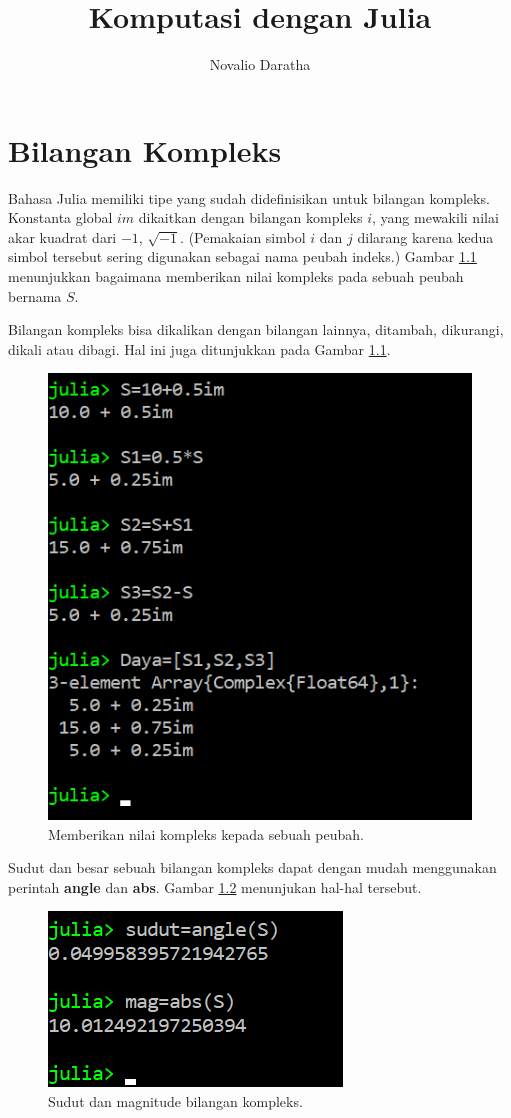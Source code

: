 \documentclass[12pt,a4paper]{memoir}
\author{Novalio Daratha}
\title{Komputasi dengan Julia}
\begin{document}
	\maketitle
	\chapter{Bilangan Kompleks}
	
	Bahasa Julia memiliki tipe yang sudah didefinisikan untuk bilangan kompleks. Konstanta global $im$ dikaitkan dengan bilangan kompleks $i$, yang mewakili nilai akar kuadrat  dari $-1$, $\sqrt{-1}$. (Pemakaian simbol $i$ dan $j$ dilarang karena kedua simbol tersebut sering digunakan sebagai nama peubah indeks.) Gambar \ref{fig:complexnumber1} menunjukkan bagaimana memberikan nilai kompleks pada sebuah peubah bernama $S$.
	
	Bilangan kompleks bisa dikalikan dengan bilangan lainnya, ditambah, dikurangi, dikali atau dibagi. Hal ini juga ditunjukkan pada Gambar \ref{fig:complexnumber1}.

\begin{figure}[h]
	\centering
	\includegraphics[width=0.7\linewidth]{images/complexnumber1}
	\caption{Memberikan nilai kompleks kepada sebuah peubah.}
	\label{fig:complexnumber1}
\end{figure}
	
	Sudut dan besar sebuah bilangan kompleks dapat dengan mudah menggunakan perintah \textbf{angle} dan \textbf{abs}. Gambar \ref{fig:complexnumber2} menunjukan hal-hal tersebut.
	
	\begin{figure}
		\centering
		\includegraphics[width=0.7\linewidth]{images/complexnumber2}
		\caption{Sudut dan magnitude bilangan kompleks.}
		\label{fig:complexnumber2}
	\end{figure}
	
\end{document}
